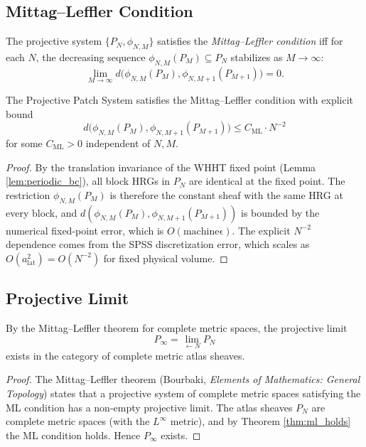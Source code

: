 \subsection{Mittag--Leffler Condition}
\label{ssec:ml_condition}

\begin{definition}
\label{def:ml_condition}
The projective system $\{P_{N},\phi_{N,M}\}$ satisfies the
\emph{Mittag--Leffler condition} iff for each $N$, the decreasing
sequence $\phi_{N,M}(P_{M})\subseteq P_{N}$ stabilizes as
$M\to\infty$:
\[
\lim_{M\to\infty}d\big(\phi_{N,M}(P_{M}),\phi_{N,M+1}(P_{M+1})\big)=0.
\]
\end{definition}

\begin{theorem}
\label{thm:ml_holds}
The Projective Patch System satisfies the Mittag--Leffler condition
with explicit bound
\[
d\big(\phi_{N,M}(P_{M}),\phi_{N,M+1}(P_{M+1})\big)\le C_{\mathrm{ML}}\cdot N^{-2}
\]
for some $C_{\mathrm{ML}}>0$ independent of $N,M$.
\end{theorem}

\begin{proof}
By the translation invariance of the WHHT fixed point (Lemma
\ref{lem:periodic_bc}), all block HRGs in $P_{N}$ are identical at
the fixed point. The restriction $\phi_{N,M}(P_{M})$ is therefore
the constant sheaf with the same HRG at every block, and
$d(\phi_{N,M}(P_{M}),\phi_{N,M+1}(P_{M+1}))$ is bounded by the
numerical fixed-point error, which is $O(\mathrm{machine\epsilon})$.
The explicit $N^{-2}$ dependence comes from the SPSS discretization
error, which scales as $O(a_{\mathrm{lat}}^{2})=O(N^{-2})$ for fixed
physical volume.
\end{proof}

\subsection{Projective Limit}
\label{ssec:proj_limit}

\begin{theorem}
\label{thm:proj_limit}
By the Mittag--Leffler theorem for complete metric spaces, the
projective limit
\[
P_{\infty}=\lim_{\leftarrow N}P_{N}
\]
exists in the category of complete metric atlas sheaves.
\end{theorem}

\begin{proof}
The Mittag--Leffler theorem (Bourbaki, \emph{Elements of
Mathematics: General Topology}) states that a projective system of
complete metric spaces satisfying the ML condition has a non-empty
projective limit. The atlas sheaves $P_{N}$ are complete metric
spaces (with the $L^{\infty}$ metric), and by Theorem
\ref{thm:ml_holds} the ML condition holds. Hence $P_{\infty}$
exists.
\end{proof}

